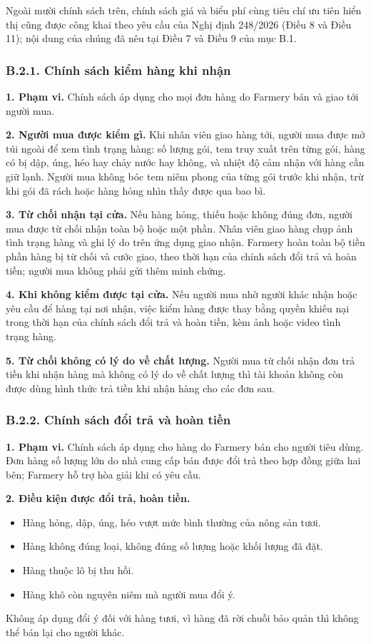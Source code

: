 Ngoài mười chính sách trên, chính sách giá và biểu phí cùng tiêu chí ưu tiên
hiển thị cũng được công khai theo yêu cầu của Nghị định 248/2026 (Điều 8 và
Điều 11); nội dung của chúng đã nêu tại Điều 7 và Điều 9 của mục B.1.

\subsubsection*{B.2.1. Chính sách kiểm hàng khi nhận}

\noindent\textbf{1. Phạm vi.} Chính sách áp dụng cho mọi đơn hàng do Farmery
bán và giao tới người mua.

\noindent\textbf{2. Người mua được kiểm gì.} Khi nhân viên giao hàng tới, người
mua được mở túi ngoài để xem tình trạng hàng: số lượng gói, tem truy xuất trên
từng gói, hàng có bị dập, úng, héo hay chảy nước hay không, và nhiệt độ cảm
nhận với hàng cần giữ lạnh. Người mua không bóc tem niêm phong của từng gói
trước khi nhận, trừ khi gói đã rách hoặc hàng hỏng nhìn thấy được qua bao bì.

\noindent\textbf{3. Từ chối nhận tại cửa.} Nếu hàng hỏng, thiếu hoặc không đúng
đơn, người mua được từ chối nhận toàn bộ hoặc một phần. Nhân viên giao hàng
chụp ảnh tình trạng hàng và ghi lý do trên ứng dụng giao nhận. Farmery hoàn
toàn bộ tiền phần hàng bị từ chối và cước giao, theo thời hạn của chính sách
đổi trả và hoàn tiền; người mua không phải gửi thêm minh chứng.

\noindent\textbf{4. Khi không kiểm được tại cửa.} Nếu người mua nhờ người khác
nhận hoặc yêu cầu để hàng tại nơi nhận, việc kiểm hàng được thay bằng quyền
khiếu nại trong thời hạn của chính sách đổi trả và hoàn tiền, kèm ảnh hoặc
video tình trạng hàng.

\noindent\textbf{5. Từ chối không có lý do về chất lượng.} Người mua từ chối
nhận đơn trả tiền khi nhận hàng mà không có lý do về chất lượng thì tài khoản
không còn được dùng hình thức trả tiền khi nhận hàng cho các đơn sau.

\subsubsection*{B.2.2. Chính sách đổi trả và hoàn tiền}

\noindent\textbf{1. Phạm vi.} Chính sách áp dụng cho hàng do Farmery bán cho
người tiêu dùng. Đơn hàng số lượng lớn do nhà cung cấp bán được đổi trả theo
hợp đồng giữa hai bên; Farmery hỗ trợ hòa giải khi có yêu cầu.

\noindent\textbf{2. Điều kiện được đổi trả, hoàn tiền.}
\begin{itemize}
    \item Hàng hỏng, dập, úng, héo vượt mức bình thường của nông sản tươi.
    \item Hàng không đúng loại, không đúng số lượng hoặc khối lượng đã đặt.
    \item Hàng thuộc lô bị thu hồi.
    \item Hàng khô còn nguyên niêm mà người mua đổi ý.
\end{itemize}
Không áp dụng đổi ý đối với hàng tươi, vì hàng đã rời chuỗi bảo quản thì không
thể bán lại cho người khác.


